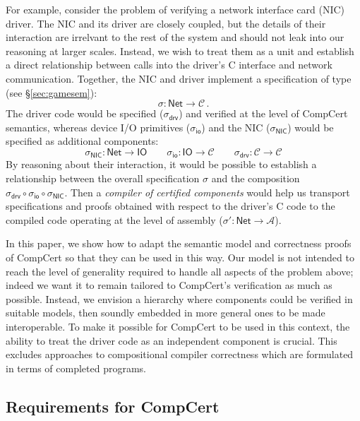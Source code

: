 \documentclass[acmsmall,screen,review,anonymous]{acmart}
\newcommand{\kw}[1]{\ensuremath{ \mathsf{#1} }}
\begin{document}
For example,
consider the problem of verifying
a network interface card (NIC) driver.
The NIC and its driver are closely coupled,
but the details of their interaction
are irrelvant to the rest of the system
and should not leak into our reasoning at larger scales.
Instead,
we wish to treat them as a unit
and establish a direct relationship between calls into
the driver's C interface and network communication.
Together, the NIC and driver implement
a specification of type (see \S\ref{sec:gamesem}):
\[
  \sigma : \kw{Net} \rightarrow \mathcal{C} \,.
\]
The driver code would be specified
($\sigma_\kw{drv}$)
and verified
at the level of CompCert semantics,
whereas device I/O primitives
($\sigma_\kw{io}$)
and the NIC
($\sigma_\kw{NIC}$)
would be specified as additional components:
\[
  \sigma_\kw{NIC} : \kw{Net} \rightarrow \kw{IO}
  \qquad
  \sigma_\kw{io} : \kw{IO} \rightarrow \mathcal{C}
  \qquad
  \sigma_\kw{drv} : \mathcal{C} \rightarrow \mathcal{C}
\]
By reasoning about their interaction,
it would be possible to establish a relationship between
the overall specification $\sigma$ and
the composition
$\sigma_\kw{drv} \circ \sigma_\kw{io} \circ \sigma_\kw{NIC}$.
Then a \emph{compiler of certified components}
would help us transport specifications and proofs
obtained with respect to the driver's C code
to the compiled code operating at the level of assembly
($\sigma' : \kw{Net} \rightarrow \mathcal{A}$).

In this paper, we show how to adapt
the semantic model and correctness proofs of CompCert
so that they can be used in this way.
Our model is not intended to reach the level of generality
required to handle all aspects of the problem above;
indeed we want it to remain tailored to CompCert's
verification as much as possible.
Instead, we envision a hierarchy
where components could be verified in suitable models,
then soundly embedded in more general ones
to be made interoperable.
To make it possible for CompCert to be used in this context,
the ability to treat the driver code as an
independent component is crucial.
This excludes approaches to
compositional compiler correctness
which are formulated in terms of completed programs.


\subsection{Requirements for CompCert} \label{sec:compcertreq} %
\end{document}
